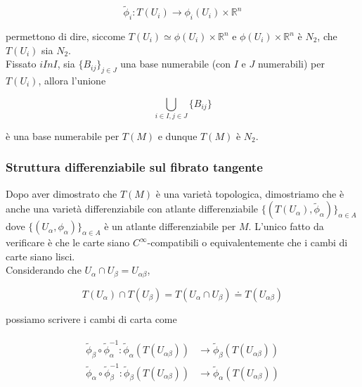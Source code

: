 \begin{equation}
	\tilde{\phi}_{i} : T(U_{i}) \to \phi_{i}(U_{i}) \times \mathbb{R}^{n}
\end{equation}

permettono di dire, siccome $ T(U_{i}) \simeq \phi(U_{i}) \times \mathbb{R}^{n} $ e $ \phi(U_{i}) \times \mathbb{R}^{n} $ è $ N_{2} $, che $ T(U_{i}) $ sia $ N_{2} $.\\
Fissato $ i In I $, sia $ \{B_{ij}\}_{j \in J} $ una base numerabile (con $ I $ e $ J $ numerabili) per $ T(U_{i}) $, allora l'unione

\begin{equation}
	\bigcup_{i \in I, j \in J} \{B_{ij}\}
\end{equation}

è una base numerabile per $ T(M) $ e dunque $ T(M) $ è $ N_{2} $.

\subsubsection{Struttura differenziabile sul fibrato tangente}

Dopo aver dimostrato che $ T(M) $ è una varietà topologica, dimostriamo che è anche una varietà differenziabile con atlante differenziabile $ \{(T(U_{\alpha}),\tilde{\phi}_{\alpha})\}_{\alpha \in A} $ dove $ \{(U_{\alpha},\phi_{\alpha})\}_{\alpha \in A} $ è un atlante differenziabile per $ M $. L'unico fatto da verificare è che le carte siano $ C^{\infty} $-compatibili o equivalentemente che i cambi di carte siano lisci.\\
Considerando che $ U_{\alpha} \cap U_{\beta} = U_{\alpha \beta} $, 

\begin{equation}
	T(U_{\alpha}) \cap T(U_{\beta}) = T(U_{\alpha} \cap U_{\beta}) \doteq T(U_{\alpha \beta})
\end{equation}

possiamo scrivere i cambi di carta come

\begin{align}
	\begin{split}
		\tilde{\phi}_{\beta} \circ \tilde{\phi}_{\alpha}^{-1} : \tilde{\phi}_{\alpha}(T(U_{\alpha \beta})) &\to \tilde{\phi}_{\beta}(T(U_{\alpha \beta}))\\
		\tilde{\phi}_{\alpha} \circ \tilde{\phi}_{\beta}^{-1} : \tilde{\phi}_{\beta}(T(U_{\alpha \beta})) &\to \tilde{\phi}_{\alpha}(T(U_{\alpha \beta}))
	\end{split}
\end{align}

